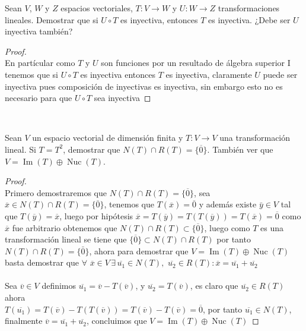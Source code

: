\documentclass[11pt]{article}
\numberwithin{equation}{section}
\begin{document}
\begin{Problema}{} Sean $V$, $W$ y $Z$ espacios vectoriales, $T: V \to W$ y $U: W \to Z$ transformaciones lineales. 
    Demostrar que si $U \circ T$ es inyectiva, entonces $T$ es inyectiva. ¿Debe ser $U$ inyectiva también?
\end{Problema}
\begin{proof}\,\\
    En part\'icular como $T$ y $U$ son funciones por un resultado de \'algebra superior I tenemos que 
    si $U\circ T$ es inyectiva entonces $T$ es inyectiva, claramente $U$ puede ser inyectiva
    pues composici\'on de inyectivas es inyectiva, sin embargo esto no es necesario para que $U\circ T$ sea inyectiva
\end{proof}\,\\


\begin{Problema}{} Sean $V$ un espacio vectorial de dimensión finita y $T: V \to V$ una transformación lineal. 
    Si $T = T^2$, demostrar que $N(T)\cap R(T)=\{\overline{0}\}$. 
    También ver que $V = \operatorname{Im}(T) \oplus \operatorname{Nuc}(T)$.
\end{Problema}
\begin{proof}
    \,\\
    Primero demostraremos que $N(T)\cap R(T)=\{\overline{0}\}$, sea $\overline{x}\in N(T)\cap R(T)=\{\overline{0}\}$, tenemos que $T(\overline{x})=\overline{0}$ y además
    existe $\bar{y}\in V$ tal que $T(\overline{y})=\overline{x}$, luego por hipótesis $\overline{x}=T(\overline{y})=T(T(\overline{y}))=T(\overline{x})=\overline{0}$
    como $\overline{x}$ fue arbitrario obtenemos que $N(T)\cap R(T)\subset\{\overline{0}\}$, luego como $T$ es una transformación lineal se tiene que $\{\overline{0}\}\subset N(T)\cap R(T)$
    por tanto $N(T)\cap R(T)=\{\bar{0}\}$, ahora para demostrar que $V = \operatorname{Im}(T) \oplus \operatorname{Nuc}(T)$ basta demostrar
    que $\forall\,\,\overline{x}\in V\,\exists\,\overline{u_1}\in N(T),\,\,\overline{u_2}\in R(T):\overline{x}=\overline{u_1}+\overline{u_2}$\,\\
    \,\\
    Sea $\overline{v}\in V$ definimos $\overline{u_1}= \overline{v}-T(\overline{v})$, y $\overline{u_2}=T(\overline{v})$, es claro 
    que $\overline{u_2}\in R(T)$ ahora\\ $T(\overline{u_1})=T(\overline{v})-T(T(\overline{v}))=T(\overline{v})-T(\overline{v})=\overline{0}$, por tanto $\overline{u_1}\in N(T)$, finalmente
    $\overline{v}=\overline{u_1}+\overline{u_2}$, concluimos que $V = \operatorname{Im}(T) \oplus \operatorname{Nuc}(T)$
\end{proof}
   
\end{document}
